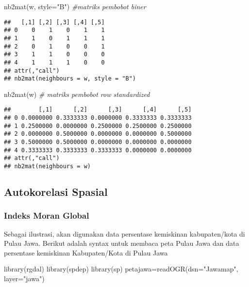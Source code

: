 \documentclass[
]{book}
\newenvironment{Shaded}{\begin{snugshade}}{\end{snugshade}}
\newcommand{\AttributeTok}[1]{\textcolor[rgb]{0.77,0.63,0.00}{#1}}
\newcommand{\CommentTok}[1]{\textcolor[rgb]{0.56,0.35,0.01}{\textit{#1}}}
\newcommand{\FunctionTok}[1]{\textcolor[rgb]{0.00,0.00,0.00}{#1}}
\newcommand{\NormalTok}[1]{#1}
\newcommand{\OtherTok}[1]{\textcolor[rgb]{0.56,0.35,0.01}{#1}}
\newcommand{\StringTok}[1]{\textcolor[rgb]{0.31,0.60,0.02}{#1}}
\begin{document}
\begin{Shaded}
\begin{Highlighting}[]
\FunctionTok{nb2mat}\NormalTok{(w, }\AttributeTok{style=}\StringTok{"B"}\NormalTok{)  }\CommentTok{\#matriks pembobot biner}
\end{Highlighting}
\end{Shaded}

\begin{verbatim}
##   [,1] [,2] [,3] [,4] [,5]
## 0    0    1    0    1    1
## 1    1    0    1    1    1
## 2    0    1    0    0    1
## 3    1    1    0    0    0
## 4    1    1    1    0    0
## attr(,"call")
## nb2mat(neighbours = w, style = "B")
\end{verbatim}

\begin{Shaded}
\begin{Highlighting}[]
\FunctionTok{nb2mat}\NormalTok{(w) }\CommentTok{\# matriks pembobot row standardized}
\end{Highlighting}
\end{Shaded}

\begin{verbatim}
##        [,1]      [,2]      [,3]      [,4]      [,5]
## 0 0.0000000 0.3333333 0.0000000 0.3333333 0.3333333
## 1 0.2500000 0.0000000 0.2500000 0.2500000 0.2500000
## 2 0.0000000 0.5000000 0.0000000 0.0000000 0.5000000
## 3 0.5000000 0.5000000 0.0000000 0.0000000 0.0000000
## 4 0.3333333 0.3333333 0.3333333 0.0000000 0.0000000
## attr(,"call")
## nb2mat(neighbours = w)
\end{verbatim}

\hypertarget{autokorelasi-spasial}{%
\subsection{Autokorelasi Spasial}\label{autokorelasi-spasial}}

\hypertarget{indeks-moran-global}{%
\subsubsection{Indeks Moran Global}\label{indeks-moran-global}}

Sebagai ilustrasi, akan digunakan data persentase kemiskinan kabupaten/kota di Pulau Jawa. Berikut adalah syntax untuk membaca peta Pulau Jawa dan data persentase kemiskinan Kabupaten/Kota di Pulau Jawa

\begin{Shaded}
\begin{Highlighting}[]
\FunctionTok{library}\NormalTok{(rgdal)}
\FunctionTok{library}\NormalTok{(spdep)}
\FunctionTok{library}\NormalTok{(sp)}
\NormalTok{petajawa}\OtherTok{=}\FunctionTok{readOGR}\NormalTok{(}\AttributeTok{dsn=}\StringTok{"Jawamap"}\NormalTok{, }\AttributeTok{layer=}\StringTok{"jawa"}\NormalTok{)}
\end{Highlighting}
\end{Shaded}
\end{document}
